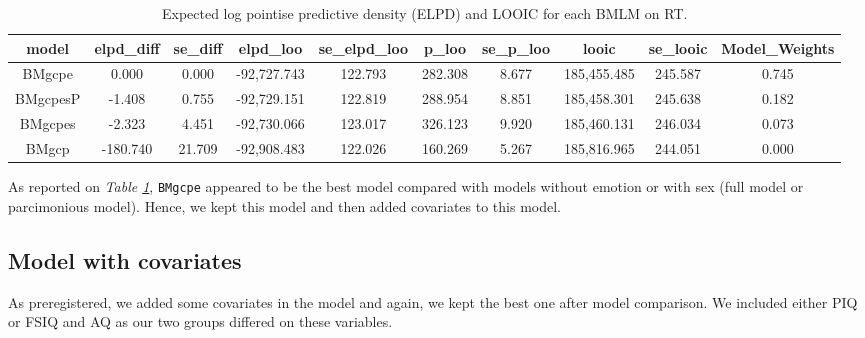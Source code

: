 \documentclass[
  11pt,
  english,
  ,doc,floatsintext]{apa6}
\begin{document}
\begin{table}[htb]

\begin{center}
\begin{threeparttable}

\caption{\label{tab:modelComp1RT}Expected log pointise predictive density (ELPD) and LOOIC for each BMLM on RT.}

\tiny{

\begin{tabular}{cccccccccc}
\toprule
model & \multicolumn{1}{c}{elpd\_diff} & \multicolumn{1}{c}{se\_diff} & \multicolumn{1}{c}{elpd\_loo} & \multicolumn{1}{c}{se\_elpd\_loo} & \multicolumn{1}{c}{p\_loo} & \multicolumn{1}{c}{se\_p\_loo} & \multicolumn{1}{c}{looic} & \multicolumn{1}{c}{se\_looic} & \multicolumn{1}{c}{Model\_Weights}\\
\midrule
BMgcpe & 0.000 & 0.000 & -92,727.743 & 122.793 & 282.308 & 8.677 & 185,455.485 & 245.587 & 0.745\\
BMgcpesP & -1.408 & 0.755 & -92,729.151 & 122.819 & 288.954 & 8.851 & 185,458.301 & 245.638 & 0.182\\
BMgcpes & -2.323 & 4.451 & -92,730.066 & 123.017 & 326.123 & 9.920 & 185,460.131 & 246.034 & 0.073\\
BMgcp & -180.740 & 21.709 & -92,908.483 & 122.026 & 160.269 & 5.267 & 185,816.965 & 244.051 & 0.000\\
\bottomrule
\end{tabular}

}

\end{threeparttable}
\end{center}

\end{table}

As reported on \emph{Table \ref{tab:modelComp1RT}}, \texttt{BMgcpe} appeared to be the best model compared with models without emotion or with sex (full model or parcimonious model). Hence, we kept this model and then added covariates to this model.

\hypertarget{model-with-covariates}{%
\subsection{Model with covariates}\label{model-with-covariates}}

As preregistered, we added some covariates in the model and again, we kept the best one after model comparison. We included either PIQ or FSIQ and AQ as our two groups differed on these variables.
\end{document}
